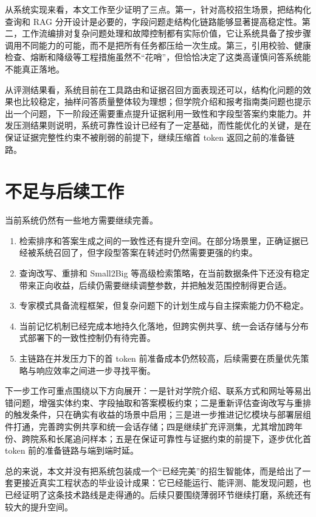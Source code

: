 \documentclass[UTF8,zihao=-4,oneside]{ctexbook}
\numberwithin{equation}{chapter}
\begin{document}
从系统实现来看，本文工作至少证明了三点。第一，针对高校招生场景，把结构化查询和 RAG 分开设计是必要的，字段问题走结构化链路能够显著提高稳定性。第二，工作流编排对复杂问题处理和故障控制都有实际价值，它让系统具备了按步骤调用不同能力的可能，而不是把所有任务都压给一次生成。第三，引用校验、健康检查、熔断和降级等工程措施虽然不“花哨”，但恰恰决定了这类高谨慎问答系统能不能真正落地。

从评测结果看，系统目前在工具路由和证据召回方面表现还可以，结构化问题的效果也比较稳定，抽样问答质量整体较为理想；但学院介绍和报考指南类问题也提示出一个问题，下一阶段还需要重点提升证据利用一致性和字段型答案约束能力。并发压测结果则说明，系统可靠性设计已经有了一定基础，而性能优化的关键，是在保证证据完整性约束不被削弱的前提下，继续压缩首 token 返回之前的准备链路。

\section{不足与后续工作}
当前系统仍然有一些地方需要继续完善。
\begin{enumerate}
  \item 检索排序和答案生成之间的一致性还有提升空间。在部分场景里，正确证据已经被系统召回了，但字段型答案在转述时仍然需要更强的约束。
  \item 查询改写、重排和 Small2Big 等高级检索策略，在当前数据条件下还没有稳定带来正向收益，后续仍需要继续调整参数，并把触发范围控制得更合适。
  \item 专家模式具备流程框架，但复杂问题下的计划生成与自主探索能力仍不稳定。
  \item 当前记忆机制已经完成本地持久化落地，但跨实例共享、统一会话存储与分布式部署下的一致性控制仍有待完善。
  \item 主链路在并发压力下的首 token 前准备成本仍然较高，后续需要在质量优先策略与响应效率之间进一步寻找平衡。
\end{enumerate}

下一步工作可重点围绕以下方向展开：一是针对学院介绍、联系方式和网址等易出错问题，增强实体约束、字段抽取和答案模板约束；二是重新评估查询改写与重排的触发条件，只在确实有收益的场景中启用；三是进一步推进记忆模块与部署层组件打通，完善跨实例共享和统一会话存储；四是继续扩充评测集，尤其增加跨年份、跨院系和长尾追问样本；五是在保证可靠性与证据约束的前提下，逐步优化首 token 前的准备链路与端到端时延。

总的来说，本文并没有把系统包装成一个“已经完美”的招生智能体，而是给出了一套更接近真实工程状态的毕业设计成果：它已经能运行、能评测、能发现问题，也已经证明了这条技术路线是走得通的。后续只要围绕薄弱环节继续打磨，系统还有较大的提升空间。
\end{document}
